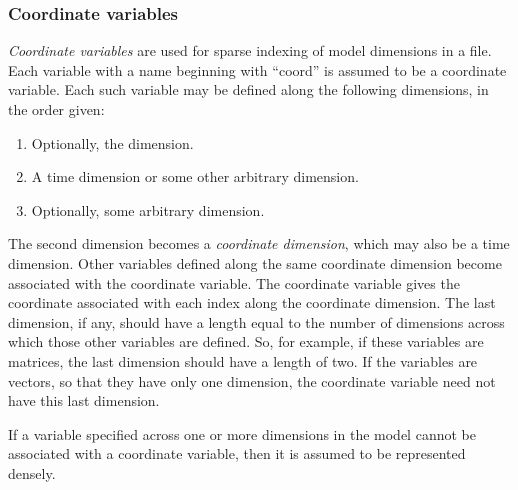 \subsubsection{Coordinate variables\label{Coordinate_variables}}

\emph{Coordinate variables} are used for sparse indexing of model dimensions
in a file. Each variable with a name beginning with ``coord'' is assumed to be
a coordinate variable. Each such variable may be defined along the following
dimensions, in the order given:
\begin{enumerate}
\item Optionally, the  dimension.
\item A time dimension or some other arbitrary dimension.
\item Optionally, some arbitrary dimension.
\end{enumerate}
The second dimension becomes a \emph{coordinate
  dimension}, which may also be a time
dimension. Other variables defined along the same coordinate dimension become
associated with the coordinate variable. The coordinate variable gives the
coordinate associated with each index along the coordinate dimension. The last
dimension, if any, should have a length equal to the number of dimensions
across which those other variables are defined. So, for example, if these
variables are matrices, the last dimension should have a length of two. If the
variables are vectors, so that they have only one dimension, the coordinate
variable need not have this last dimension.


If a variable specified across one or more dimensions in the model cannot be
associated with a coordinate variable, then it is assumed to be represented
densely.

